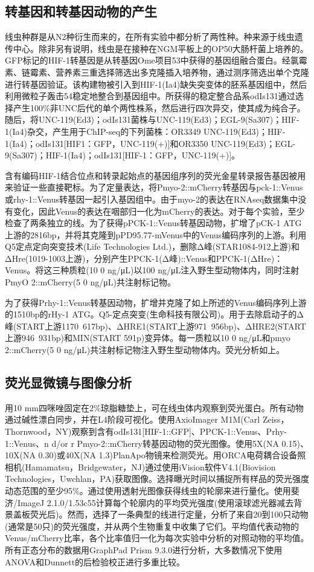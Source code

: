 \documentclass{ctexart}
\begin{document}
    \subsection{转基因和转基因动物的产生}
    线虫种群是从N2种衍生而来的，在所有实验中都分析了两性种。种来源于线虫遗传中心。除非另有说明，线虫是在接种在NGM平板上的OP50大肠杆菌上培养的。GFP标记的HIF-1转基因是从转基因Ome项目53中获得的基因组融合蛋白。经氯霉素、链霉素、营养素三重选择筛选出多克隆插入培养物，通过测序筛选出单个克隆进行转基因验证。该构建物被引入到HIF-1(Ia4)缺失突变体的胚系基因组中，然后利用微粒子轰击54稳定地整合到基因组中。所获得的稳定整合品系odIs131通过选择产生100\%非UNC后代的单个两性株系，然后进行四次异交，使其成为纯合子。随后，将UNC-119(Ed3)；odIs131菌株与UNC-119(Ed3)；EGL-9(Sa307)；HIF-1(Ia4)杂交，产生用于ChIP-seq的下列菌株：OR3349 UNC-119(Ed3)；HIF-1(Ia4)；odIs131[HIF1：GFP，UNC-119(+)]和OR3350 UNC-119(Ed3)；EGL-9(Sa307)；HIF-1(Ia4)；odIs131[HIF-1：GFP，UNC-119(+)]。

    含有编码HIF-1结合位点和转录起始点的基因组序列的荧光金星转录报告基因被用来验证一些直接靶标。为了定量表达，将Pmyo-2::mCherry转基因与pck-1::Venus或rhy-1::Venus转基因一起引入基因组中。由于myo-2的表达在RNAseq数据集中没有变化，因此Venus的表达在咽部归一化为mCherry的表达。对于每个实验，至少检查了两条独立的线。为了获得pPCK-1::Venus转基因动物，扩增了pCK-1 ATG上游的2816bp，并将其克隆到pPD95.77-mVenus中的Venus编码序列的上游。利用Q5定点定向突变技术(Life Technologies Ltd.)，删除Δ峰(STAR1084-912上游)和ΔHre(1019-1003上游)，分别产生PPCK-1(Δ峰)::Venus和PPCK-1(ΔHre)：Venus。将这三种质粒(10 0 ng/μL)以100 ng/μL注入野生型动物体内，同时注射PmyO 2::mCherry(5 0 ng/μL)共注射标记物。

    为了获得Prhy-1::Venus转基因动物，扩增并克隆了如上所述的Venus编码序列上游的1510bp的rHy-1 ATG。Q5-定点突变(生命科技有限公司)。用于去除启动子的Δ峰(START上游1170~617bp)、ΔHRE1(START上游971~956bp)、ΔHRE2(START上游946~931bp)和MIN(START 591p)变异体。每一质粒以10 0 ng/μL和pmyo 2::mCherry(5 0 ng/μL)共注射标记物注入野生型动物体内。荧光分析如上。

    \subsection{荧光显微镜与图像分析}

    用10 mm四咪唑固定在2\%琼脂糖垫上，可在线虫体内观察到荧光蛋白。所有动物通过碱性漂白同步，并在L4阶段可视化。使用AxioImager M1M(Carl Zeiss，Thornwood，NY)观察到含有odIs131[HIF-1::GFP]、PPCK-1::Venus、Prhy-1::Venus、n d/or r Pmyo-2::mCherry转基因动物的荧光图像。使用5X(NA 0.15)、10X(NA 0.30)或40X(NA 1.3)PlanApo物镜来检测荧光。用ORCA电荷耦合设备照相机(Hamamatsu，Bridgewater，NJ)通过使用iVision软件V4.1(Biovision Technologies，Uwchlan，PA)获取图像。选择曝光时间以捕捉所有样品的荧光强度动态范围的至少95\%。通过使用透射光图像获得线虫的轮廓来进行量化。使用斐济/ImageJ 2.1.0/1.53c55计算每个轮廓内的平均荧光强度(使用滚球滤光器减去背景盖板荧光后)。然而，选择了一条典型的线进行定量，分析了来自20到100只动物(通常是50只)的荧光强度，并从两个生物重复中收集了它们。平均值代表动物的Venus/mCherry比率，各个比率值归一化为每次实验中分析的对照动物的平均值。所有正态分布的数据用GraphPad Prism 9.3.0进行分析，大多数情况下使用ANOVA和Dunnett的后检验校正进行多重比较。
\end{document}
